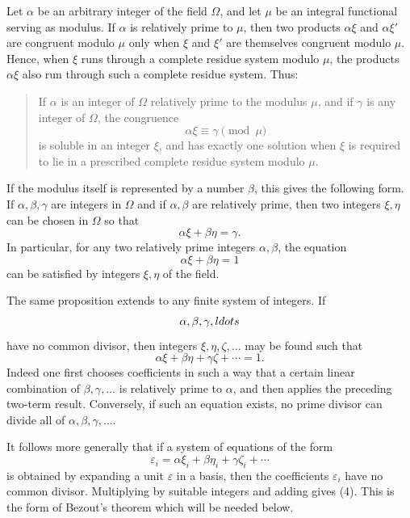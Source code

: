 \documentclass[12pt,a4paper]{article}
\begin{document}
Let \(\alpha\) be an arbitrary integer of the field \(\Omega\), and let \(\mu\) be an integral functional serving as modulus.  If \(\alpha\) is relatively prime to \(\mu\), then two products \(\alpha\xi\) and \(\alpha\xi'\) are congruent modulo \(\mu\) only when \(\xi\) and \(\xi'\) are themselves congruent modulo \(\mu\).  Hence, when \(\xi\) runs through a complete residue system modulo \(\mu\), the products \(\alpha\xi\) also run through such a complete residue system.  Thus:

\begin{quote}
If \(\alpha\) is an integer of \(\Omega\) relatively prime to the modulus \(\mu\), and if \(\gamma\) is any integer of \(\Omega\), the congruence
\begin{equation}
 \alpha \xi \equiv \gamma \pmod{\mu} \tag{1}
\end{equation}
is soluble in an integer \(\xi\), and has exactly one solution when \(\xi\) is required to lie in a prescribed complete residue system modulo \(\mu\).
\end{quote}

If the modulus itself is represented by a number \(\beta\), this gives the following form.  If \(\alpha,\beta,\gamma\) are integers in \(\Omega\) and if \(\alpha,\beta\) are relatively prime, then two integers \(\xi,\eta\) can be chosen in \(\Omega\) so that
\begin{equation}
 \alpha\xi+\beta\eta=\gamma. \tag{2}
\end{equation}
In particular, for any two relatively prime integers \(\alpha,\beta\), the equation
\begin{equation}
 \alpha\xi+\beta\eta=1 \tag{3}
\end{equation}
can be satisfied by integers \(\xi,\eta\) of the field.

The same proposition extends to any finite system of integers.  If
\[
 \alpha,\beta,\gamma,\\ldots
\]
have no common divisor, then integers \(\xi,\eta,\zeta,
\ldots\) may be found such that
\begin{equation}
 \alpha\xi+\beta\eta+\gamma\zeta+\cdots=1. \tag{4}
\end{equation}
Indeed one first chooses coefficients in such a way that a certain linear combination of \(\beta,\gamma,\ldots\) is relatively prime to \(\alpha\), and then applies the preceding two-term result.  Conversely, if such an equation exists, no prime divisor can divide all of \(\alpha,\beta,\gamma,
\ldots\).

It follows more generally that if a system of equations of the form
\begin{equation}
 \varepsilon_i = \alpha\xi_i+\beta\eta_i+
\gamma\zeta_i+
\cdots \tag{5}
\end{equation}
is obtained by expanding a unit \(\varepsilon\) in a basis, then the coefficients \(\varepsilon_i\) have no common divisor.  Multiplying by suitable integers and adding gives (4).  This is the form of Bezout's theorem which will be needed below.
\end{document}
